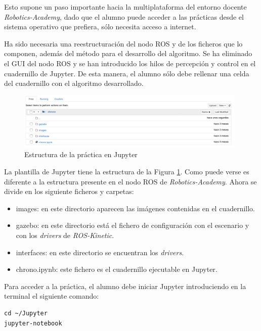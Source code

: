 Esto supone un paso importante hacia la multiplataforma del entorno docente \textit{Robotics-Academy}, dado que el alumno puede acceder a las prácticas desde el sistema operativo que prefiera, sólo necesita acceso a internet.

Ha sido necesaria una reestructuración del nodo ROS y de los ficheros que lo componen, además del método para el desarrollo del algoritmo. Se ha eliminado el GUI del nodo ROS y se han introducido los hilos de percepción y control en el cuadernillo de Jupyter. De esta manera, el alumno sólo debe rellenar una celda del cuadernillo con el algoritmo desarrollado.

\begin{figure}[H]
  \begin{center}
    \includegraphics[width=0.98\textwidth]{figures/estructura_jupyter.png}
		\caption{Estructura de la práctica en Jupyter}
		\label{fig.ejch}
		\end{center}
\end{figure}

La plantilla de Jupyter tiene la estructura de la Figura \ref{fig.ejch}. Como puede verse es diferente a la estructura presente en el nodo ROS de \textit{Robotics-Academy}. Ahora se divide en los siguiente ficheros y carpetas:

\begin{itemize}
    \item images: en este directorio aparecen las imágenes contenidas en el cuadernillo.
    \item gazebo: en este directorio está el fichero de configuración con el escenario y con los \textit{drivers} de \textit{ROS-Kinetic}.
    \item interfaces: en este directorio se encuentran los \textit{drivers}.
    \item chrono.ipynb: este fichero es el cuadernillo ejecutable en Jupyter.
\end{itemize}

Para acceder a la práctica, el alumno debe iniciar Jupyter introduciendo en la terminal el siguiente comando:

\lstset{language=bash, breaklines=true, basicstyle=\footnotesize}
\begin{lstlisting}[frame=single]
cd ~/Jupyter
jupyter-notebook
\end{lstlisting}

